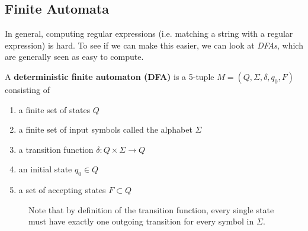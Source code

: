\subsection{Finite Automata}

  In general, computing regular expressions (i.e. matching a string with a regular expression) is hard. To see if we can make this easier, we can look at \textit{DFAs}, which are generally seen as easy to compute. 

  \begin{definition}
    A \textbf{deterministic finite automaton (DFA)} is a 5-tuple $M = (Q, \Sigma, \delta, q_0, F)$ consisting of 
    \begin{enumerate}
      \item a finite set of states $Q$
      \item a finite set of input symbols called the alphabet $\Sigma$
      \item a transition function $\delta: Q \times \Sigma \to Q$
      \item an initial state $q_0 \in Q$ 
      \item a set of accepting states $F \subset Q$
    \end{enumerate}

    \begin{figure}[H]
      \centering 
      \caption{Note that by definition of the transition function, every single state must have exactly one outgoing transition for every symbol in $\Sigma$.} 
      \label{fig:dfa}
    \end{figure}
  \end{definition}

